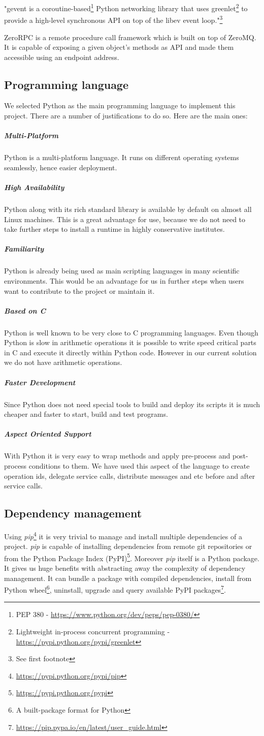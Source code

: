 "gevent is a coroutine-based\footnote{PEP 380 - \url{https://www.python.org/dev/peps/pep-0380/}}
Python networking library that 
uses greenlet\footnote{Lightweight in-process concurrent programming - \url{https://pypi.python.org/pypi/greenlet}} 
to provide a high-level synchronous API on top of the libev event loop."\footnote{See first footnote}

ZeroRPC is a remote procedure call framework which is built on top of ZeroMQ.
It is capable of exposing a given object's methods as API and made them accessible using an endpoint address.

\subsection{Programming language}
We selected Python as the main programming language to implement this project. 
There are a number of justifications to do so. Here are the main ones:

\subparagraph{Multi-Platform} Python is a multi-platform language. It runs on different operating systems
seamlessly, hence easier deployment.
\subparagraph{High Availability} Python along with its rich standard library is available by default on almost all Linux machines. This
is a great advantage for use, because we do not need to take further steps to install a runtime in highly conservative institutes.
\subparagraph{Familiarity} Python is already being used as main scripting languages in many scientific environments. This would be an advantage
for us in further steps when users want to contribute to the project or maintain it.
\subparagraph{Based on C} Python is well known to be very close to C programming languages. Even though Python is slow in arithmetic operations
it is possible to write speed critical parts in C and execute it directly within Python code. However in our current solution we do not have
arithmetic operations.
\subparagraph{Faster Development} Since Python does not need special tools to build and deploy its scripts it is much cheaper and faster
to start, build and test programs.
\subparagraph{Aspect Oriented Support} With Python it is very easy to wrap methods and apply pre-process and post-process conditions to them. We have
used this aspect of the language to create operation ids, delegate service calls, distribute messages and etc before and after service calls.

\subsection{Dependency management} Using \textit{pip}\footnote{\url{https://pypi.python.org/pypi/pip}}
it is very trivial to manage and install multiple
dependencies of a project. 
\textit{pip} is capable of installing dependencies from remote git repositories or from 
the Python Package Index (PyPI)\footnote{\url{https://pypi.python.org/pypi}}. Moreover \textit{pip} itself is
a Python package. It gives us huge benefits with abstracting away the complexity of dependency management. It can
bundle a package with compiled dependencies, install from Python wheel\footnote{A built-package format for Python}, uninstall,
upgrade and query available PyPI packages\footnote{\url{https://pip.pypa.io/en/latest/user_guide.html}}.

